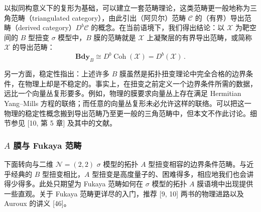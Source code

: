 以拟同构意义下的复形为基础，可以建立一套范畴理论，这类范畴更一般地称为三角范畴（triangulated category），由此引出（阿贝尔）范畴 $\mathcal{C}$ 的（有界）导出范畴（derived category）$D^b\mathcal{C}$ 的概念。在当前语境下，我们得出结论：以 $\mathcal{X}$ 为靶空间的 $B$ 型扭变 $\sigma$ 模型中，$B$ 膜的范畴就是 $\mathcal{X}$ 上凝聚层的有界导出范畴，或简称 $\mathcal{X}$ 的导出范畴：
\begin{equation}\tag{2.47}
\mathbf{Bdy}_B \cong D^b\operatorname{Coh}(\mathcal{X}) = D^b(\mathcal{X})\,.
\end{equation}

另一方面，稳定性指出：上述许多 $B$ 膜虽然是拓扑扭变理论中完全合格的边界条件，在物理上却是不稳定的。事实上，在扭变之前定义一个边界条件所需的数据，远比一个向量丛复形要多。例如，物理的膜要求向量丛上存在满足 Hermitian Yang–Mills 方程的联络；而任意的向量丛复形未必允许这样的联络。可以把这一物理的稳定性概念搬到导出范畴乃至更一般的三角范畴中，但本文不作此讨论。细节参见 [10, 第 5 章] 及其中的文献。

\subsubsection{$A$ 膜与 Fukaya 范畴}

下面转向与二维 $\mathcal{N}=(2,2)$ $\sigma$ 模型的拓扑 $A$ 型扭变相容的边界条件范畴。与近乎经典的 $B$ 型扭变相比，$A$ 型扭变是高度量子的、困难得多，相应地我们也会讲得少得多。此处只期望为 Fukaya 范畴如何在 $\sigma$ 模型的拓扑 $A$ 膜语境中出现提供一些直观。关于 Fukaya 范畴更详尽的入门，推荐 [9, 10] 两书的物理进路以及 Auroux 的讲义 [46]。

